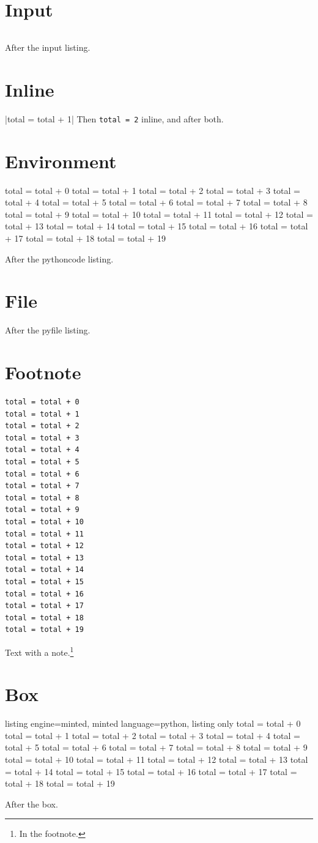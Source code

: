 \documentclass{article}
\begin{document}
\section{Input}
\inputminted[linenos]{python}{test-idxminted-code.py}
After the input listing.
\section{Inline}
|total = total + 1|
Then \texttt{total = 2} inline, and after both.
\section{Environment}
\begin{pythoncode}
total = total + 0
total = total + 1
total = total + 2
total = total + 3
total = total + 4
total = total + 5
total = total + 6
total = total + 7
total = total + 8
total = total + 9
total = total + 10
total = total + 11
total = total + 12
total = total + 13
total = total + 14
total = total + 15
total = total + 16
total = total + 17
total = total + 18
total = total + 19
\end{pythoncode}
After the pythoncode listing.
\section{File}
After the pyfile listing.
\section{Footnote}
\begin{verbatim}
total = total + 0
total = total + 1
total = total + 2
total = total + 3
total = total + 4
total = total + 5
total = total + 6
total = total + 7
total = total + 8
total = total + 9
total = total + 10
total = total + 11
total = total + 12
total = total + 13
total = total + 14
total = total + 15
total = total + 16
total = total + 17
total = total + 18
total = total + 19
\end{verbatim}
Text with a note.\footnote{In the footnote.}
\section{Box}
\begin{tcblisting}{listing engine=minted, minted language=python, listing only}
total = total + 0
total = total + 1
total = total + 2
total = total + 3
total = total + 4
total = total + 5
total = total + 6
total = total + 7
total = total + 8
total = total + 9
total = total + 10
total = total + 11
total = total + 12
total = total + 13
total = total + 14
total = total + 15
total = total + 16
total = total + 17
total = total + 18
total = total + 19
\end{tcblisting}
After the box.
\end{document}
